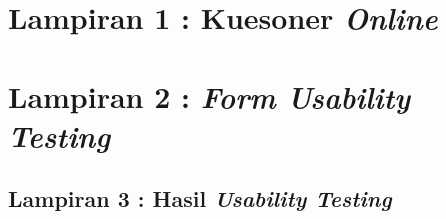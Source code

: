 \chapter*{Lampiran 1 : Kuesoner \textit{Online}}



\chapter*{Lampiran 2 : \textit{Form Usability Testing}}


\begin{landscape}
	\chapter*{Lampiran 3 : Hasil \textit{Usability Testing}}
	
\end{landscape}
